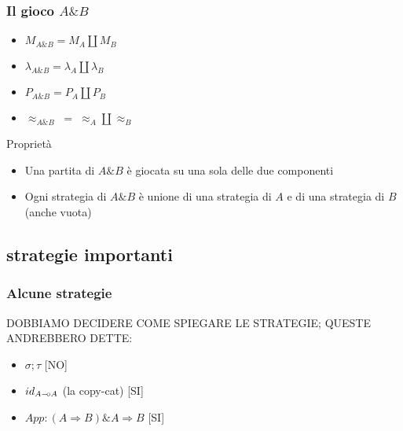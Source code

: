 \documentclass{beamer}
\newcommand{\limp}{\mathbin{{-}\mkern-3.5mu{\circ}}}
\begin{document}
\begin{frame}[t]

	
	
\end{frame}
	


\begin{frame}
	
	\frametitle{Il gioco $A \& B$}
	
	\begin{itemize}
		\item $M_{A\& B}=M_A \coprod M_B$
		\item $\lambda_{A\& B}=\lambda_A \coprod \lambda_B$
		\item $P_{A\& B}=P_A \coprod P_B$
		\item $\approx_{A\& B} \; = \; \approx_A \coprod \approx_B$ 
	\end{itemize}
	
	\begin{block}{Proprietà}
		\begin{itemize}
			\item Una partita di $A\& B$ è giocata su una sola delle due componenti
			\item Ogni strategia di $A\& B$ è unione di una strategia di $A$ e di una strategia di $B$ (anche vuota)
		\end{itemize}
		
	\end{block}
	
\end{frame}


\begin{frame}[t]
\end{frame}


\subsection{strategie importanti}

\begin{frame}

	\frametitle{Alcune strategie}
	
	DOBBIAMO DECIDERE COME SPIEGARE LE STRATEGIE; QUESTE ANDREBBERO DETTE:
	\begin{itemize}
		\item $\sigma ; \tau$ [NO]
		\item $id_{A\limp A}$ (la copy-cat) [SI]
		\item $App:(A \Rightarrow B)\& A \Rightarrow B$ [SI]
	\end{itemize}

\end{frame}
\end{document}
